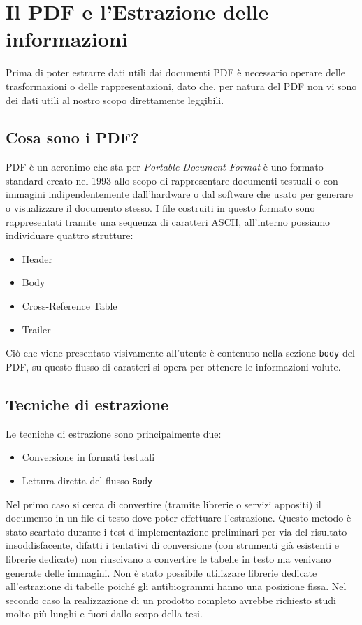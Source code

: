 \chapter{Il PDF e l'Estrazione delle informazioni}
Prima di poter estrarre dati utili dai documenti PDF è necessario operare delle trasformazioni o delle rappresentazioni, dato che, per natura del PDF non vi sono dei dati utili al nostro scopo direttamente leggibili.

\section{Cosa sono i PDF?}
PDF è un acronimo che sta per \textit{Portable Document Format} è uno formato standard creato nel 1993 allo scopo di rappresentare documenti testuali o con immagini indipendentemente dall'hardware o dal software che usato per generare o visualizzare il documento stesso. I file costruiti in questo formato sono rappresentati tramite una sequenza di caratteri ASCII, all'interno possiamo individuare quattro strutture:

\begin{itemize}
	\item Header
	\item Body
	\item Cross-Reference Table
	\item Trailer
\end{itemize}
Ciò che viene presentato visivamente all'utente è contenuto nella sezione \texttt{body} del PDF, su questo flusso di caratteri si opera per ottenere le informazioni volute.
\newpage
\section{Tecniche di estrazione}
Le tecniche di estrazione sono principalmente due:
\begin{itemize}
	\item Conversione in formati testuali
	\item Lettura diretta del flusso \texttt{Body}
\end{itemize}

Nel primo caso si cerca di convertire (tramite librerie o servizi appositi) il documento in un file di testo dove poter effettuare l'estrazione. Questo metodo è stato scartato durante i test d'implementazione preliminari per via del risultato insoddisfacente, difatti i tentativi di conversione (con strumenti già esistenti e librerie dedicate) non riuscivano a convertire le tabelle in testo ma venivano generate delle immagini. 
Non è stato possibile utilizzare librerie dedicate all'estrazione di tabelle poiché gli antibiogrammi hanno una posizione fissa.
Nel secondo caso la realizzazione di un prodotto completo avrebbe richiesto studi molto più lunghi e fuori dallo scopo della tesi.
